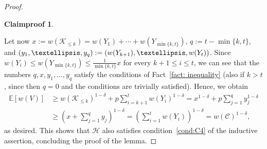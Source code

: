 \documentclass[10pt,a4paper]{amsart}
\newtheorem{claimproof}{Claimproof}
\begin{document}
\begin{proof}
\begin{claimproof}
\textcolor{white}{hack}
\end{claimproof}

Let now $x:=w(\mathcal{K}_{\le k})=w(Y_1)+\cdots+w(Y_{\min\{k,t\}})$, $q:=t-\min\{k,t\}$, and $(y_1,\ldots,y_{q}):=\linebreak(w(Y_{k+1}),\ldots,w(Y_t))$. Since $w(Y_i)\le w(Y_{\min\{k,t\}})\le \frac{1}{\min\{k,t\}}x$ for every $k+1\le i \le t$, we can see that the numbers $q,x,y_1,\ldots,y_q$ satisfy the conditions of Fact~\ref{fact: inequality} (also if $k>t$, since then $q=0$ and the conditions are trivially satisfied). Hence, we obtain
 \begin{align*}
        \mathbb{E}[w(V)]&\ge w(\mathcal K_{\leq k})^{1-\delta}+p\sum_{i=k+1}^t w(Y_i)^{1-\delta}=x^{1-\delta}+p\sum_{j=1}^q y_j^{1-\delta}\\
        &\ge \left(x+\sum_{j=1}^q y_j\right)^{1-\delta}=\left(\sum_{i=1}^tw(Y_i)\right)^{1-\delta}=w(\mathcal{C})^{1-\delta},
    \end{align*}
    as desired. This shows that $\mathcal{H}$ also satisfies condition~\ref{cond:C4} of the inductive assertion, concluding the proof of the lemma.
\end{proof}
\end{document}
